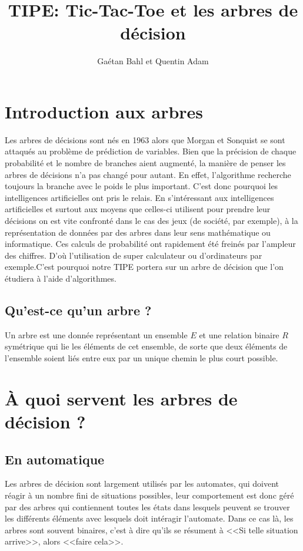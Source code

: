 \documentclass{article}
\title{TIPE: Tic-Tac-Toe et les arbres de décision}
\author{Gaétan Bahl et Quentin Adam}
\begin{document}
\maketitle
\tableofcontents
\listoffigures

\clearpage

\section{Introduction aux arbres}

Les arbres de décisions sont nés en 1963 alors que Morgan et Sonquist se sont attaqués au problème de prédiction de variables. Bien que la précision de chaque probabilité et le nombre de branches aient augmenté, la manière de penser les arbres de décisions n'a pas changé pour autant. En effet, l'algorithme recherche toujours la branche avec le poids le plus important. C'est donc pourquoi les intelligences artificielles ont pris le relais.
En s'intéressant aux intelligences artificielles et surtout aux moyens que
celles-ci utilisent pour prendre leur décisions
on est vite confronté dans le cas des jeux (de société, par exemple), à la
représentation de données par des arbres dans leur sens mathématique ou
informatique. Ces calculs de probabilité ont rapidement été freinés par l'ampleur des chiffres. D'où l'utilisation de super calculateur ou d'ordinateurs par exemple.C'est pourquoi notre TIPE portera sur un arbre de décision que l'on étudiera à l'aide d'algorithmes.


\subsection{Qu'est-ce qu'un arbre ?}

Un arbre est une donnée représentant un ensemble $E$ et une relation binaire $R$
symétrique qui lie les éléments de cet ensemble,
de sorte que deux éléments de l'ensemble soient liés entre eux par un unique
chemin le plus court possible.


\section{\uppercase{à} quoi servent les arbres de décision ?}

\subsection{En automatique}

Les arbres de décision sont largement utilisés par les automates,
 qui doivent réagir à un nombre fini de situations possibles,
leur comportement est donc géré par des arbres qui contiennent
 toutes les états dans lesquels peuvent se trouver les différents
éléments avec lesquels doit intéragir l'automate.
Dans ce cas là, les arbres sont souvent binaires,
c'est à dire qu'ils se résument à <<Si telle situation arrive>>, alors <<faire
cela>>.
\end{document}
